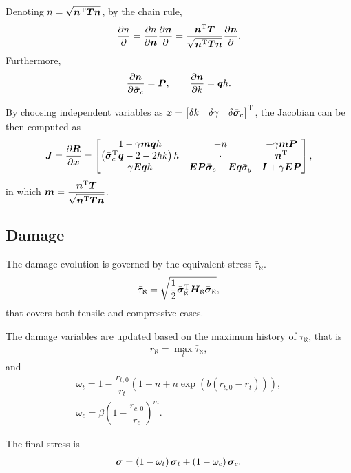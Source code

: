 Denoting $n=\sqrt{\bm{n}^{\mathrm{T}}\bm{T}\bm{n}}$, by the chain rule,
\begin{gather}
\dfrac{\partial{n}}{\partial{}}=\dfrac{\partial{n}}{\partial{\bm{n}}}\dfrac{\partial{\bm{n}}}{\partial{}}=\dfrac{\bm{n}^{\mathrm{T}}\bm{T}}{\sqrt{\bm{n}^{\mathrm{T}}\bm{T}\bm{n}}}\dfrac{\partial{\bm{n}}}{\partial{}}.
\end{gather}
Furthermore,
\begin{gather}
\dfrac{\partial{\bm{n}}}{\partial{\bar{\bm{\sigma}}_c}}=\bm{P},\qquad
\dfrac{\partial{\bm{n}}}{\partial{k}}=\bm{q}{}h.
\end{gather}

By choosing independent variables as $\bm{x}=\begin{bmatrix}
\delta{}k&\delta\gamma&\delta\bar{\bm{\sigma}}_c
\end{bmatrix}^{\mathrm{T}}$, the Jacobian can be then computed as
\begin{gather}
\bm{J}=\dfrac{\partial{\bm{R}}}{\partial{\bm{x}}}=\begin{bmatrix}
1-\gamma\bm{m}\bm{q}{}h&-n&-\gamma\bm{m}\bm{P}\\
\left(\bar{\bm{\sigma}}_c^{\mathrm{T}}\bm{q}-2-2hk\right)h&\cdot&\bm{n}^{\mathrm{T}}\\
\gamma\bm{E}\bm{q}h&\bm{E}\bm{P}\bar{\bm{\sigma}}_c+\bm{E}\bm{q}\bar{\sigma}_y&\bm{I}+\gamma\bm{E}\bm{P}
\end{bmatrix},
\end{gather}
in which $\bm{m}=\dfrac{\bm{n}^{\mathrm{T}}\bm{T}}{\sqrt{\bm{n}^{\mathrm{T}}\bm{T}\bm{n}}}$.
\subsection{Damage}
The damage evolution is governed by the equivalent stress $\bar{\tau}_{\aleph}$.
\begin{gather}
\bar{\tau}_{\aleph}=\sqrt{\dfrac{1}{2}\bar{\bm{\sigma}}_\aleph^{\mathrm{T}}\bm{H}_\aleph\bar{\bm{\sigma}}_\aleph},
\end{gather}
that covers both tensile and compressive cases.

The damage variables are updated based on the maximum history of $\bar{\tau}_{\aleph}$, that is
\begin{gather}
r_\aleph=\max_t\bar{\tau}_{\aleph},
\end{gather}
and
\begin{gather}
\omega_t=1-\dfrac{r_{t,0}}{r_t}\left(1-n+n\exp\left(b\left(r_{t,0}-r_t\right)\right)\right),\\
\omega_c=\beta\left(1-\dfrac{r_{c,0}}{r_c}\right)^m.
\end{gather}

The final stress is
\begin{gather}
\bm{\sigma}=\left(1-\omega_t\right)\bar{\bm{\sigma}}_t+\left(1-\omega_c\right)\bar{\bm{\sigma}}_c.
\end{gather}

